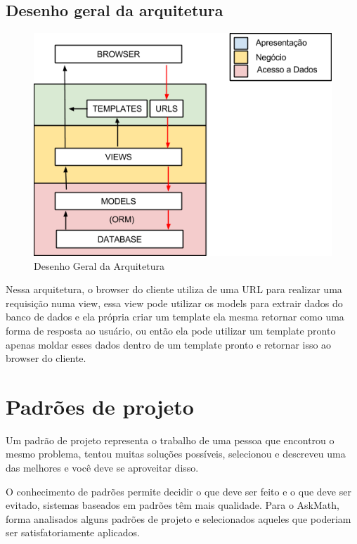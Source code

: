 \subsection{Desenho geral da arquitetura}
\begin{figure}[H]
\centering
\includegraphics[width=15cm]{figuras/figura_arquitetura.png}
\caption{Desenho Geral da Arquitetura}
\label{figura_arquitetura}
\end{figure}

Nessa arquitetura, o browser do cliente utiliza de uma URL para realizar uma 
requisição numa view, essa view pode utilizar os models para extrair dados do 
banco de dados e ela própria criar um template ela mesma retornar como uma forma 
de resposta ao usuário, ou então ela pode utilizar um template pronto apenas 
moldar esses dados dentro de um template pronto e retornar isso ao browser do 
cliente. 

\section{Padrões de projeto}
Um padrão de projeto representa o trabalho de uma pessoa que encontrou o mesmo 
problema, tentou muitas soluções possíveis, selecionou e descreveu uma das 
melhores e você deve se aproveitar disso.

O conhecimento de padrões permite decidir o que deve ser feito e o que deve ser 
evitado, sistemas baseados em padrões têm mais qualidade. Para o AskMath, forma 
analisados alguns padrões  de projeto e selecionados aqueles que poderiam ser 
satisfatoriamente aplicados. 


